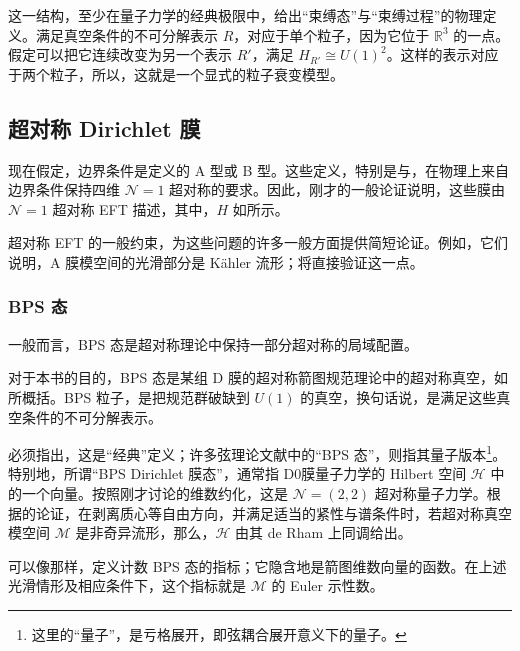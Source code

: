 这一结构，至少在量子力学的经典极限中，给出“束缚态”与“束缚过程”的物理定义。满足真空条件的不可分解表示 $R$，对应于单个粒子，因为它位于 $\mathbb{R}^3$ 的一点。假定可以把它连续改变为另一个表示 $R'$，满足 $H_{R'}\cong U(1)^2$。这样的表示对应于两个粒子，所以，这就是一个显式的粒子衰变模型。

\subsection{超对称 Dirichlet 膜}\label{sec:5.4.3}

现在假定，边界条件是定义的 A 型或 B 型。这些定义，特别是与，在物理上来自边界条件保持四维 $\mathcal{N}=1$ 超对称的要求。因此，刚才的一般论证说明，这些膜由 $\mathcal{N}=1$ 超对称 EFT 描述，其中，$H$ 如所示。

超对称 EFT 的一般约束，为这些问题的许多一般方面提供简短论证。例如，它们说明，A 膜模空间的光滑部分是 K\"ahler 流形；将直接验证这一点。

\subsubsection{BPS 态}\label{sec:5.4.3.1}

一般而言，BPS 态是超对称理论中保持一部分超对称的局域配置。

对于本书的目的，BPS 态是某组 D 膜的超对称箭图规范理论中的超对称真空，如所概括。BPS 粒子，是把规范群破缺到 $U(1)$ 的真空，换句话说，是满足这些真空条件的不可分解表示。

必须指出，这是“经典”定义；许多弦理论文献中的“BPS 态”，则指其量子版本\footnote{这里的“量子”，是亏格展开，即弦耦合展开意义下的量子。}。特别地，所谓“BPS Dirichlet 膜态”，通常指 D0膜量子力学的 Hilbert 空间 $\mathcal{H}$ 中的一个向量。按照刚才讨论的维数约化，这是 $\mathcal{N}=(2,2)$ 超对称量子力学。根据的论证，在剥离质心等自由方向，并满足适当的紧性与谱条件时，若超对称真空模空间 $\mathcal{M}$ 是非奇异流形，那么，$\mathcal{H}$ 由其 de Rham 上同调给出。

可以像那样，定义计数 BPS 态的指标；它隐含地是箭图维数向量的函数。在上述光滑情形及相应条件下，这个指标就是 $\mathcal{M}$ 的 Euler 示性数。

